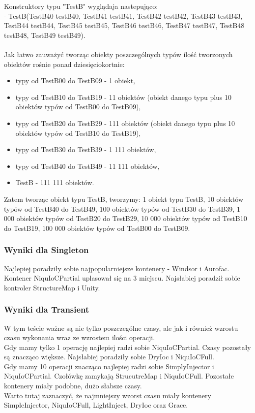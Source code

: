 \documentclass[12pt]{article}
\begin{document}
Konstruktory typu "TestB" wyglądaja nastepująco:\\
- TestB(TestB40 testB40, TestB41 testB41, TestB42 testB42, TestB43 testB43, TestB44 testB44, TestB45 testB45, TestB46 testB46, TestB47 testB47, TestB48 testB48, TestB49 testB49).\\
\\
Jak łatwo zauważyć tworząc obiekty poszczególnych typów ilość tworzonych obiektów rośnie ponad dziesięciokortnie:
\begin{itemize}
	\item typy od TestB00 do TestB09 - 1 obiekt,
	\item typy od TestB10 do TestB19 - 11 obiektów (obiekt danego typu plus 10 obiektów typów od TestB00 do TestB09),
	\item typy od TestB20 do TestB29 - 111 obiektów (obiekt danego typu plus 10 obiektów typów od TestB10 do TestB19),
	\item typy od TestB30 do TestB39 - 1 111 obiektów,
	\item  typy od TestB40 do TestB49 - 11 111 obiektów,
	\item TestB - 111 111 obiektów.
\end{itemize}
Zatem tworząc obiekt typu TestB, tworzymy: 1 obiekt typu TestB, 10 obiektów typów od TestB40 do TestB49, 100 obiektów typów od TestB30 do TestB39, 1 000 obiektów typów od TestB20 do TestB29, 10 000 obiektów typów od TestB10 do TestB19, 100 000 obiektów typów od TestB00 do TestB09.

\subsubsection{Wyniki dla Singleton}
Najlepiej poradziły sobie najpopularniejsze kontenery - Windsor i Aurofac. Kontener NiquIoCPartial uplasował się na 3 miejscu. Najsłabiej poradził sobie kontroler StructureMap i Unity.

\subsubsection{Wyniki dla Transient}
W tym teście ważne są nie tylko poszczególne czasy, ale jak i również wzrostu czasu wykonania wraz ze wzrostem ilości operacji.\\
Gdy mamy tylko 1 operację najlepiej radzi sobie NiquIoCPartial. Czasy pozostały są znacząco większe. Najsłabiej poradziły sobie DryIoc i NiquIoCFull.\\
Gdy mamy 10 operacji znacząco najlepiej radzi sobie SimplyInjector i NiquIoCPartial. Czołówkę zamykają StrucutreMap i NiquIoCFull. Pozostałe kontenery miały podobne, dużo słabsze czasy.\\
Warto tutaj zaznaczyć, że najmniejszy wzorst czasu miały kontenery SimpleInjector, NiquIoCFull, LightInject, DryIoc oraz Grace.
\end{document}
